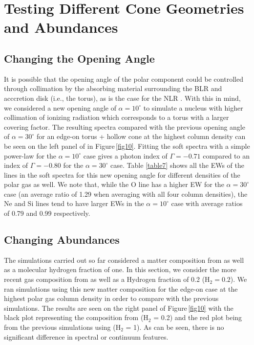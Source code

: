 \documentclass[fleqn,usenatbib]{mnras}
\begin{document}
    \section{Testing Different Cone Geometries and Abundances}
    
        \subsection{Changing the Opening Angle}
    
            It is possible that the opening angle of the polar component could be controlled through collimation by the absorbing material surrounding the BLR and acccretion disk (i.e., the torus), as is the case for the NLR \citep{2013ApJS..209....1F}. With this in mind, we considered a new opening angle of $\alpha = 10^{\circ}$ to simulate a nucleus with higher collimation of ionizing radiation which corresponds to a torus with a larger covering factor. The resulting spectra compared with the previous opening angle of $\alpha = 30^{\circ}$ for an edge-on torus + hollow cone at the highest column density can be seen on the left panel of in Figure\,\ref{fig10}. Fitting the soft spectra with a simple power-law for the $\alpha = 10^{\circ}$ case gives a photon index of $\Gamma = -0.71$ compared to an index of $\Gamma = -0.80$ for the $\alpha = 30^{\circ}$ case. Table \ref{table7} shows all the EWs of the lines in the soft spectra for this new opening angle for different densities of the polar gas as well. We note that, while the O line has a higher EW for the  $\alpha = 30^{\circ}$ case (an average ratio of 1.29 when averaging with all four column densities), the Ne and Si lines tend to have larger EWs in the  $\alpha = 10^{\circ}$ case with average ratios of 0.79 and 0.99 respectively.
            
        \subsection{Changing Abundances}
        
            The simulations carried out so far considered a matter composition from \cite{1989GeCoA..53..197A} as well as a molecular hydrogen fraction of one. In this section, we consider the more recent gas composition from \cite{2003ApJ...591.1220L} as well as a Hydrogen fraction of 0.2 (H$_{2} = 0.2$). We ran simulations using this new matter composition for the edge-on case at the highest polar gas column density in order to compare with the previous simulations. The results are seen on the right panel of Figure\,\ref{fig10} with the black plot representing the composition from \cite{2003ApJ...591.1220L} (H$_{2}$ = 0.2) and the red plot being from the previous simulations using \cite{1989GeCoA..53..197A} (H$_{2}$ = 1). As can be seen, there is no significant difference in spectral or continuum features. 
    
\end{document}
